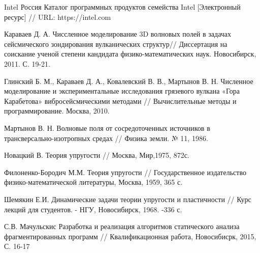 \begingroup 
\renewcommand{\section}[2]{\anonsection{Библиографический список}}
\begin{thebibliography}{00}

	Intel Россия
    Каталог программных продуктов семейства Intel [Электронный ресурс] //
    URL: https://intel.com

    Караваев Д. А.
    Чиссленное моделирование 3D волновых полей в задачах сейсмического зондирования вулканических структур//
    Диссертация на соискание ученой степени кандидата физико-математических наук. Новосибирск, 2011. С. 19-21.

    Глинский Б. М., Караваев Д. А., Ковалевский В. В., Мартынов В. Н.
    Численное моделирование и экспериментальные исследования грязевого вулкана «Гора Карабетова» вибросейсмическими методами //
    Вычислительные методы и программирование. Москва, 2010.

    Мартынов В. Н.
    Волновые поля от сосредоточенных источников в трансверсально-изотропных средах //
    Физика земли. № 11, 1986.

    Новацкий В.
    Теория упругости //
    Москва, Мир,1975, 872с.

	Филоненко-Бородич М.М.
	Теория упругости //
	Государственное издательство физико-математической литературы, Москва, 1959, 365 с.

	Шемякин Е.И.
	Динамические задачи теории упругости и пластичности //
	Курс лекций для студентов. - НГУ, Новосибирск, 1968. -336 с.

	С.В. Мачульскис
	Разработка и реализация алгоритмов статического анализа фрагментированных программ //
	Квалификационная работа, Новосибисрк, 2015, С. 16-17

\end{thebibliography}
\endgroup

\clearpage